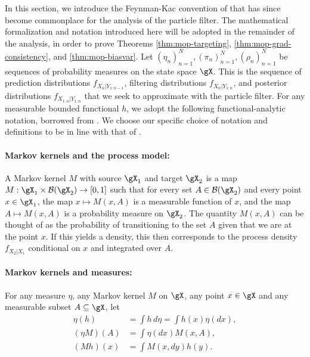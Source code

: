 

In this section, we introduce the Feynman-Kac convention of \cite{delMoral04} that has since become commonplace \cite{karjalainen23} for the analysis of the particle filter. The mathematical formalization and notation introduced here will be adopted in the remainder of the analysis, in order to prove Theorems \ref{thm:mop-targeting}, \ref{thm:mop-grad-consistency}, and \ref{thm:mop-biasvar}. Let $(\eta_n)_{n=1}^N, (\pi_n)_{n=1}^N, (\rho_n)_{n=1}^N$ be sequences of probability measures on the state space $\gX$. This is the sequence of prediction distributions $f_{X_{n}|Y_{1:n-1}}$, filtering distributions $f_{X_{n}|Y_{1:n}}$, and posterior distributions $f_{X_{1:n}|Y_{1:n}}$ that we seek to approximate with the particle filter. For any measurable bounded functional $h$, we adopt the following functional-analytic notation, borrowed from \cite{delMoral04, chopin20, karjalainen23}. We choose our specific choice of notation and definitions to be in line with that of \cite{karjalainen23}. 


\paragraph{Markov kernels and the process model:} A Markov kernel $M$ with source $\gX_1$ and target $\gX_2$ is a map $M: \gX_1 \times \mathcal{B}(\gX_2) \to [0,1]$ such that for every set $A \in \mathcal{B}(\gX_2)$ and every point $x \in \gX_1$, the map $x \mapsto M(x, A)$ is a measurable function of $x$, and the map $A \mapsto M(x,A)$ is a probability measure on $\gX_2$. The quantity $M(x,A)$ can be thought of as the probability of transitioning to the set $A$ given that we are at the point $x$. If this yields a density, this then corresponds to the process density $f_{X_{2}|X_1}$ conditional on $x$ and integrated over $A$.  

\paragraph{Markov kernels and measures:} For any measure $\eta$, any Markov kernel $M$ on $\gX$, any point $x \in \gX$ and any measurable subset $A \subseteq \gX$, let 
\begin{align}
    \eta(h) &= \int h \, d\eta = \int h(x) \eta(dx), \\(\eta M)(A) &= \int \eta(dx)M(x,A), \\
    (Mh)(x) &= \int M(x, dy) h(y).
\end{align}

